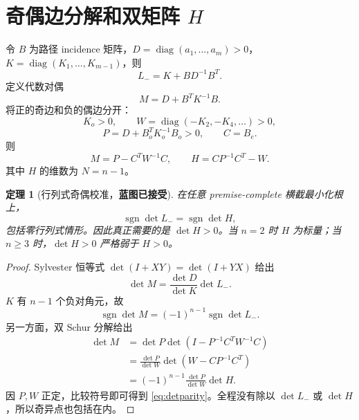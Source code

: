 \documentclass[UTF8,12pt,openany,fontset=fandol]{ctexrep}
\newtheorem{theorem}{定理}[chapter]
\theoremstyle{definition}
\newcommand{\sgn}{\operatorname{sgn}}
\newcommand{\diag}{\operatorname{diag}}
\newcommand{\Trusted}{\textcolor{green!45!black}{\textbf{蓝图已接受}}}
\begin{document}
\section{奇偶边分解和双矩阵 $H$}

令 $B$ 为路径 incidence 矩阵，$D=\diag(a_1,\ldots,a_m)>0$，$K=\diag(K_1,\ldots,K_{m-1})$，则
\begin{equation}
 L_-=K+BD^{-1}B^T.
\end{equation}
定义代数对偶
\begin{equation}
 M=D+B^TK^{-1}B.
\end{equation}
将正的奇边和负的偶边分开：
\begin{equation}
 K_o>0,\qquad W=\diag(-K_{2},-K_4,\ldots)>0,
\end{equation}
\begin{equation}
 P=D+B_o^TK_o^{-1}B_o>0,\qquad C=B_e.
\end{equation}
则
\begin{equation}
 M=P-C^TW^{-1}C,\qquad
 H=CP^{-1}C^T-W.
\end{equation}
其中 $H$ 的维数为 $N=n-1$。

\begin{theorem}[行列式奇偶校准，\Trusted]\label{thm:parity}
在任意 premise-complete 横截最小化根上，
\begin{equation}\label{eq:detparity}
 \sgn\det L_-=\sgn\det H,
\end{equation}
包括零行列式情形。因此真正需要的是 $\det H>0$。当 $n=2$ 时 $H$ 为标量；当 $n\ge3$ 时，$\det H>0$ 严格弱于 $H>0$。
\end{theorem}

\begin{proof}
Sylvester 恒等式 $\det(I+XY)=\det(I+YX)$ 给出
\begin{equation}
 \det M=\frac{\det D}{\det K}\det L_-.
\end{equation}
$K$ 有 $n-1$ 个负对角元，故
\begin{equation}
 \sgn\det M=(-1)^{n-1}\sgn\det L_-.
\end{equation}
另一方面，双 Schur 分解给出
\begin{align*}
 \det M
 &=\det P\det(I-P^{-1}C^TW^{-1}C)\\
 &=\frac{\det P}{\det W}\det(W-CP^{-1}C^T)\\
 &=(-1)^{n-1}\frac{\det P}{\det W}\det H.
\end{align*}
因 $P,W$ 正定，比较符号即可得到 \eqref{eq:detparity}。全程没有除以 $\det L_-$ 或 $\det H$，所以奇异点也包括在内。
\end{proof}
\end{document}
